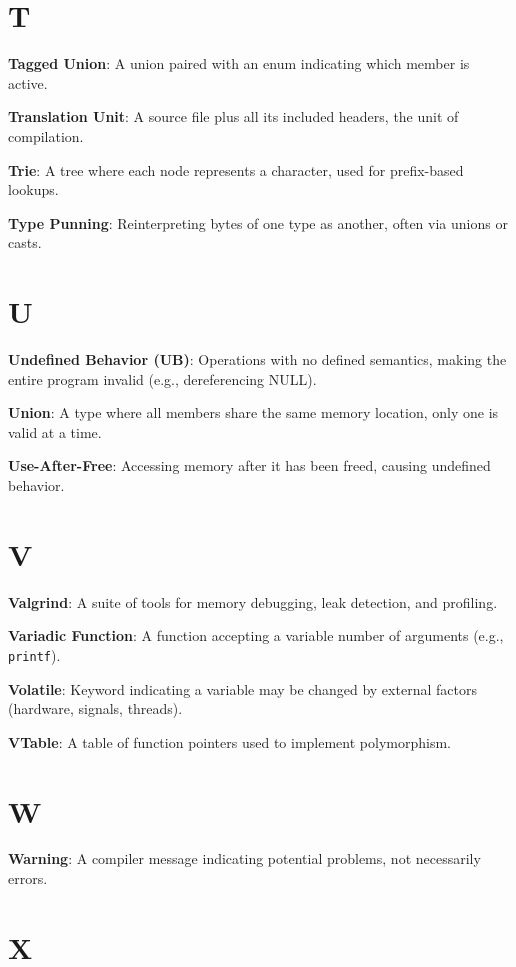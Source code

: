 \documentclass[10pt,openany]{book}
\begin{document}
\section*{T}

\textbf{Tagged Union}: A union paired with an enum indicating which member is active.

\textbf{Translation Unit}: A source file plus all its included headers, the unit of compilation.

\textbf{Trie}: A tree where each node represents a character, used for prefix-based lookups.

\textbf{Type Punning}: Reinterpreting bytes of one type as another, often via unions or casts.

\section*{U}

\textbf{Undefined Behavior (UB)}: Operations with no defined semantics, making the entire program invalid (e.g., dereferencing NULL).

\textbf{Union}: A type where all members share the same memory location, only one is valid at a time.

\textbf{Use-After-Free}: Accessing memory after it has been freed, causing undefined behavior.

\section*{V}

\textbf{Valgrind}: A suite of tools for memory debugging, leak detection, and profiling.

\textbf{Variadic Function}: A function accepting a variable number of arguments (e.g., \texttt{printf}).

\textbf{Volatile}: Keyword indicating a variable may be changed by external factors (hardware, signals, threads).

\textbf{VTable}: A table of function pointers used to implement polymorphism.

\section*{W}

\textbf{Warning}: A compiler message indicating potential problems, not necessarily errors.

\section*{X}
\end{document}
